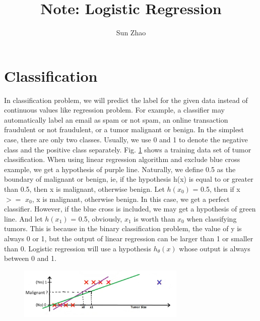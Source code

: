 \documentclass{article}
\title{Note: Logistic Regression}
\author{Sun Zhao}
\begin{document}
\maketitle
\newpage

\section{Classification}
In classification problem, we will predict the label for the given data instead of continuous values like regression problem. For example, a classifier may automatically label an email as spam or not spam, an online transaction fraudulent or not fraudulent, or a tumor malignant or benign. In the simplest case, there are only two classes. Usually, we use 0 and 1 to denote the negative class and the positive class separately. Fig. \ref{classification_example} shows a training data set of tumor classification. When using linear regression algorithm and exclude blue cross example, we get a hypothesis of purple line. Naturally, we define 0.5 as the boundary of malignant or benign, ie, if the hypothesis h(x) is equal to or greater than 0.5, then x is malignant, otherwise benign. Let $h(x_{0})$ = 0.5, then if x $>=$ $x_{0}$, x is malignant, otherwise benign. In this case, we get a perfect classifier. However, if the blue cross is included, we may get a hypothesis of green line. And let $h(x_{1})$ = 0.5, obviously, $x_{1}$ is worth than $x_{0}$ when classifying tumors. This is because in the binary classification problem, the value of y is always 0 or 1, but the output of linear regression can be larger than 1 or smaller than 0. Logistic regression will use a hypothesis $h_{\theta}(x)$ whose output is always between 0 and 1.

\begin{figure}[ht]
  \centering
  \includegraphics[width=8cm]{Figure1.jpg}\\
  \caption{}\label{classification_example}
\end{figure}
\end{document}
